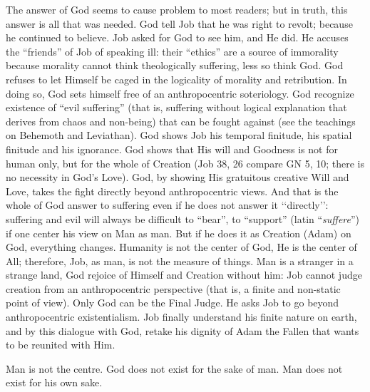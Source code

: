 The answer of God seems to cause problem to most readers; but in truth, this answer is all that was needed. God tell Job that he was right to revolt; because he continued to believe. Job asked for God to see him, and He did. He accuses the ``friends” of Job of speaking ill: their ``ethics” are a source of immorality because morality cannot think theologically suffering, less so think God. God refuses to let Himself be caged in the logicality of morality and retribution. In doing so, God sets himself free of an anthropocentric soteriology. God recognize existence of ``evil suffering” (that is, suffering without logical explanation that derives from chaos and non-being) that can be fought against (see the teachings on Behemoth and Leviathan). God shows Job his temporal finitude, his spatial finitude and his ignorance. God shows that His will and Goodness is not for human only, but for the whole of Creation (Job 38, 26 compare GN 5, 10; there is no necessity in God's Love). God, by showing His gratuitous creative Will and Love, takes the fight directly beyond anthropocentric views. And that is the whole of God answer to suffering even if he does not answer it ‘‘directly’’: suffering and evil will always be difficult to ``bear”, to ``support” (latin ``\emph{suffere}”) if one center his view on Man as man. But if he does it as Creation (Adam) on God, everything changes. Humanity is not the center of God, He is the center of All; therefore, Job, as man, is not the measure of things. Man is a stranger in a strange land, God rejoice of Himself and Creation without him: Job cannot judge creation from an anthropocentric perspective (that is, a finite and non-static point of view). Only God can be the Final Judge. He asks Job to go beyond anthropocentric existentialism. Job finally understand his finite nature on earth, and by this dialogue with God, retake his dignity of Adam the Fallen that wants to be reunited with Him.

\begin{quotex}
Man is not the centre. God does not exist for the sake of man. Man does not exist for his own sake.
\end{quotex}

